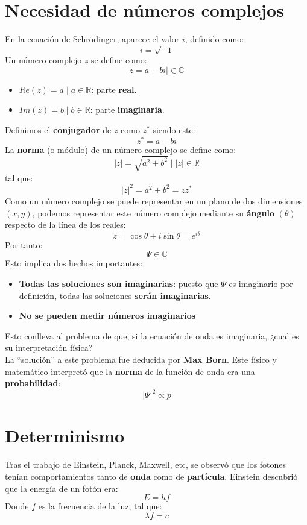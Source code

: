 \documentclass{article}
\begin{document}
\section*{Necesidad de números complejos}
En la ecuación de Schrödinger, aparece el valor $i$, definido como:
\[
    i=\sqrt{-1}
\]
Un número complejo $z$ se define como:
\[
    z=a+bi\mid \in \mathbb{C}
\]
\begin{itemize}
    \item $Re(z)=a\mid a\in \mathbb{R}$: parte \textbf{real}.
    \item $Im(z)= b \mid b \in \mathbb{R}$: parte \textbf{imaginaria}.
\end{itemize}
Definimos el \textbf{conjugador} de $z$ como $z^{*}$ siendo este:
\[
    z^{*}=a-bi
\]
La \textbf{norma} (o módulo) de un número complejo se define como:
\[
    |z|=\sqrt{a^{2}+b^{2}}\mid |z|\in \mathbb{R}
\]
tal que:
\[
    |z|^2=a^2+b^2=zz^{*}
\]
Como un número complejo se puede representar en un plano de dos dimensiones $(x,y)$, podemos representar este número complejo mediante su \textbf{ángulo} $(\theta)$ respecto de la línea de los reales:
\[
    z=\cos \theta + i \sin \theta=e^{i \theta}
\]
Por tanto:
\[
    \Psi \in \mathbb{C}
\]
Esto implica dos hechos importantes:
\begin{itemize}
    \item \textbf{Todas las soluciones son imaginarias}: puesto que $\Psi$ es imaginario por definición, todas las soluciones \textbf{serán imaginarias}.
    \item \textbf{No se pueden medir números imaginarios}
\end{itemize}
Esto conlleva al problema de que, si la ecuación de onda es imaginaria, ¿cual es su interpretación física?\\
La ``solución'' a este problema fue deducida por \textbf{Max Born}. Este físico y matemático interpretó que la \textbf{norma} de la función de onda era una \textbf{probabilidad}:
\[
    |\Psi|^{2} \propto p
\]
\noindent{}
\pagebreak
\section*{Determinismo}
Tras el trabajo de Einstein, Planck, Maxwell, etc, se observó que los fotones tenían comportamientos tanto de \textbf{onda}  como de \textbf{partícula}. Einstein descubrió que la energía de un fotón era:
\[
    E=h f
\]
Donde $f$ es la frecuencia de la luz, tal que:
\[
    \lambda f =c
\]
\end{document}
